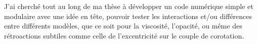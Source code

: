J'ai cherché tout au long de ma thèse à développer un code numérique simple et modulaire avec une idée en tête, pouvoir tester les interactions et/ou différences entre différents modèles, que ce soit pour la viscosité, l'opacité, ou même des rétroactions subtiles comme celle de l'excentricité sur le couple de corotation. 




